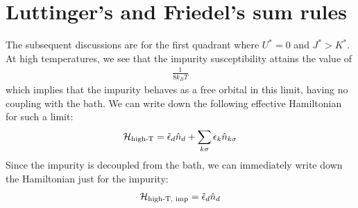 \documentclass[12pt,twoside]{report}
\numberwithin{equation}{section}
\begin{document}
\section{Luttinger's and Friedel's sum rules}
The subsequent discussions are for the first quadrant where \(U^* = 0\) and \(J^* > K^*\). At high temperatures, we see that the impurity susceptibility attains the value of
\begin{equation}\begin{aligned}
	\frac{1}{8k_B T}
\end{aligned}\end{equation}
which implies that the impurity behaves as a free orbital in this limit, having no coupling with the bath. We can write down the following effective Hamiltonian for such a limit:
\begin{equation}\begin{aligned}
	\mathcal{H}_\text{high-T} = \tilde \epsilon_d \hat n_d + \sum_{k\sigma} \epsilon_k\hat n_{k\sigma}
\end{aligned}\end{equation}
Since the impurity is decoupled from the bath, we can immediately write down the Hamiltonian just for the impurity:
\begin{equation}\begin{aligned}
	\mathcal{H}_\text{high-T, imp} = \tilde \epsilon_d \hat n_d
\end{aligned}\end{equation}
\end{document}
